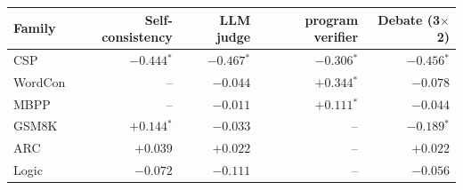 \begin{tabular}{lrrrr}
\toprule
Family & Self-consistency & LLM judge & program verifier & Debate (3$\times$2) \\
\midrule
CSP & $-0.444$$^{*}$ & $-0.467$$^{*}$ & $-0.306$$^{*}$ & $-0.456$$^{*}$ \\
WordCon & -- & $-0.044$ & $+0.344$$^{*}$ & $-0.078$ \\
MBPP & -- & $-0.011$ & $+0.111$$^{*}$ & $-0.044$ \\
GSM8K & $+0.144$$^{*}$ & $-0.033$ & -- & $-0.189$$^{*}$ \\
ARC & $+0.039$ & $+0.022$ & -- & $+0.022$ \\
Logic & $-0.072$ & $-0.111$ & -- & $-0.056$ \\
\bottomrule
\end{tabular}